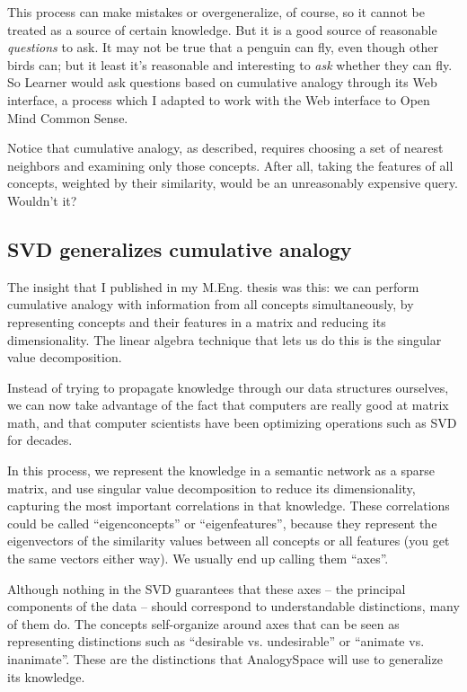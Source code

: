 \documentclass[11pt]{article}
\begin{document}
This process can make mistakes or overgeneralize, of course, so it cannot be
treated as a source of certain knowledge. But it is a good source of reasonable
{\em questions} to ask. It may not be true that a penguin can fly, even though
other birds can; but it least it's reasonable and interesting to {\em ask}
whether they can fly. So {\sc Learner} would ask questions based on cumulative
analogy through its Web interface, a process which I adapted to work with the
Web interface to Open Mind Common Sense.

Notice that cumulative analogy, as described, requires choosing a set of
nearest neighbors and examining only those concepts. After all, taking the
features of all concepts, weighted by their similarity, would be an
unreasonably expensive query. Wouldn't it?

\subsection{SVD generalizes cumulative analogy}

The insight that I published in my M.Eng. thesis \cite{analogyspace} was this:
we can perform cumulative analogy with information from all concepts
simultaneously, by representing concepts and their features in a matrix and
reducing its dimensionality. The linear algebra technique that lets us do this
is the singular value decomposition.

Instead of trying to propagate knowledge through our data structures ourselves,
we can now take advantage of the fact that computers are really good at matrix
math, and that computer scientists have been optimizing operations such as SVD
for decades.

In this process, we represent the knowledge in a semantic network as a sparse
matrix, and use singular value decomposition to reduce its dimensionality,
capturing the most important correlations in that knowledge.  These
correlations could be called ``eigenconcepts'' or ``eigenfeatures'', because
they represent the eigenvectors of the similarity values between all concepts
or all features (you get the same vectors either way). We usually end up
calling them ``axes''.

Although nothing in the SVD guarantees that these axes -- the
principal components of the data -- should correspond to understandable
distinctions, many of them do. The concepts self-organize around axes that can
be seen as representing distinctions such as ``desirable vs. undesirable'' or
``animate vs. inanimate''. These are the distinctions that AnalogySpace will
use to generalize its knowledge.
\end{document}
